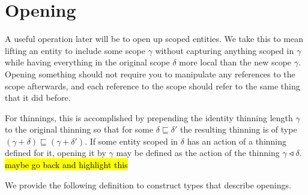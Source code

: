 \section{Opening}
\label{sec:Opening}



A useful operation later will be to open up scoped entities. We take this
to mean lifting an entity to include some scope $γ$ without capturing
anything scoped in $γ$ while having everything in the original scope $δ$
more local than the new scope $γ$. Opening something should not require you
to manipulate any references to the scope afterwards, and each reference to
the scope should refer to the same thing that it did before.

For thinnings, this is accomplished by prepending the identity thinning
length $γ$ to the original thinning so that for some $δ ⊑ δ'$ the resulting
thinning is of type $(γ + δ) ⊑ (γ + δ')$. If some entity scoped in $δ$ has an
action of a thinning defined for it, opening it by $γ$ may be defined as the
action of the thinning $γ ◃ δ$. \hl{maybe go back and highlight this}

We provide the following definition to construct types that describe openings.

